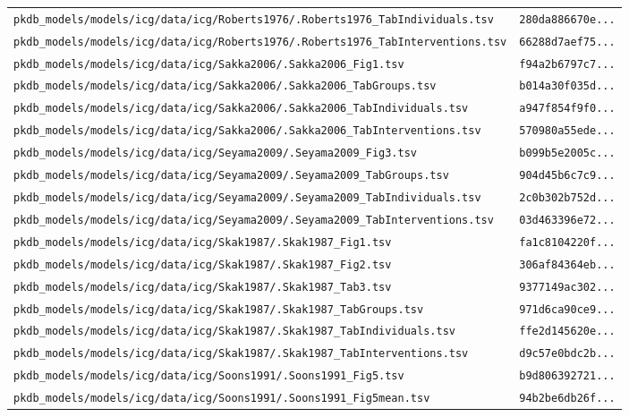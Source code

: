 \begin{longtable}{ll}
\texttt{pkdb\_models/models/icg/data/icg/Roberts1976/.Roberts1976\_TabIndividuals.tsv} & \texttt{280da886670e...} \\
\texttt{pkdb\_models/models/icg/data/icg/Roberts1976/.Roberts1976\_TabInterventions.tsv} & \texttt{66288d7aef75...} \\
\texttt{pkdb\_models/models/icg/data/icg/Sakka2006/.Sakka2006\_Fig1.tsv} & \texttt{f94a2b6797c7...} \\
\texttt{pkdb\_models/models/icg/data/icg/Sakka2006/.Sakka2006\_TabGroups.tsv} & \texttt{b014a30f035d...} \\
\texttt{pkdb\_models/models/icg/data/icg/Sakka2006/.Sakka2006\_TabIndividuals.tsv} & \texttt{a947f854f9f0...} \\
\texttt{pkdb\_models/models/icg/data/icg/Sakka2006/.Sakka2006\_TabInterventions.tsv} & \texttt{570980a55ede...} \\
\texttt{pkdb\_models/models/icg/data/icg/Seyama2009/.Seyama2009\_Fig3.tsv} & \texttt{b099b5e2005c...} \\
\texttt{pkdb\_models/models/icg/data/icg/Seyama2009/.Seyama2009\_TabGroups.tsv} & \texttt{904d45b6c7c9...} \\
\texttt{pkdb\_models/models/icg/data/icg/Seyama2009/.Seyama2009\_TabIndividuals.tsv} & \texttt{2c0b302b752d...} \\
\texttt{pkdb\_models/models/icg/data/icg/Seyama2009/.Seyama2009\_TabInterventions.tsv} & \texttt{03d463396e72...} \\
\texttt{pkdb\_models/models/icg/data/icg/Skak1987/.Skak1987\_Fig1.tsv} & \texttt{fa1c8104220f...} \\
\texttt{pkdb\_models/models/icg/data/icg/Skak1987/.Skak1987\_Fig2.tsv} & \texttt{306af84364eb...} \\
\texttt{pkdb\_models/models/icg/data/icg/Skak1987/.Skak1987\_Tab3.tsv} & \texttt{9377149ac302...} \\
\texttt{pkdb\_models/models/icg/data/icg/Skak1987/.Skak1987\_TabGroups.tsv} & \texttt{971d6ca90ce9...} \\
\texttt{pkdb\_models/models/icg/data/icg/Skak1987/.Skak1987\_TabIndividuals.tsv} & \texttt{ffe2d145620e...} \\
\texttt{pkdb\_models/models/icg/data/icg/Skak1987/.Skak1987\_TabInterventions.tsv} & \texttt{d9c57e0bdc2b...} \\
\texttt{pkdb\_models/models/icg/data/icg/Soons1991/.Soons1991\_Fig5.tsv} & \texttt{b9d806392721...} \\
\texttt{pkdb\_models/models/icg/data/icg/Soons1991/.Soons1991\_Fig5mean.tsv} & \texttt{94b2be6db26f...} \\

\end{longtable}

